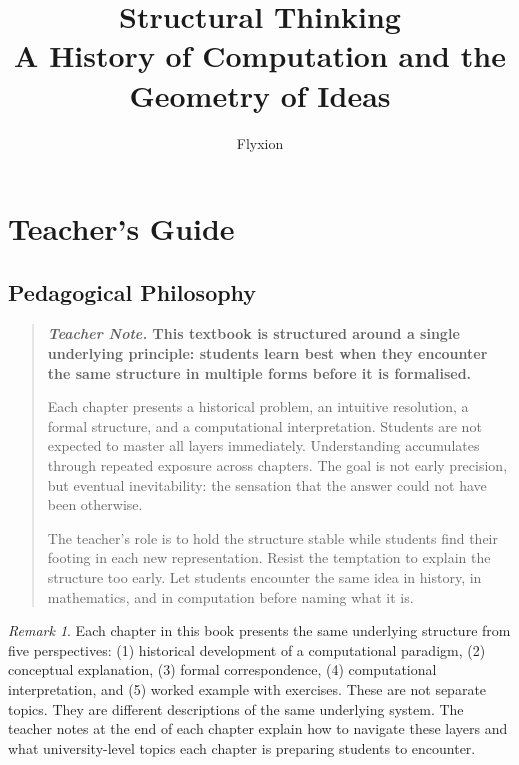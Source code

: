 \documentclass[11pt]{book}
\title{\textbf{Structural Thinking}\\[6pt]
\large A History of Computation and the Geometry of Ideas}
\author{Flyxion}
\date{}
\theoremstyle{plain}
\theoremstyle{definition}
\theoremstyle{remark}
\newtheorem{remark}[theorem]{Remark}
\newenvironment{teachernote}
  {\begin{quote}\small\bfseries\textit{Teacher Note.}\normalfont\small\enspace\ignorespaces}
  {\end{quote}}
\begin{document}

\frontmatter
\maketitle
\tableofcontents

\chapter*{Teacher's Guide}

\section*{Pedagogical Philosophy}

\begin{teachernote}
This textbook is structured around a single underlying principle:
students learn best when they encounter the same structure in multiple
forms before it is formalised.

Each chapter presents a historical problem, an intuitive resolution, a
formal structure, and a computational interpretation. Students are not
expected to master all layers immediately. Understanding accumulates
through repeated exposure across chapters. The goal is not early
precision, but eventual inevitability: the sensation that the answer
could not have been otherwise.

The teacher's role is to hold the structure stable while students find
their footing in each new representation. Resist the temptation to
explain the structure too early. Let students encounter the same idea
in history, in mathematics, and in computation before naming what it is.
\end{teachernote}

\begin{remark}
Each chapter in this book presents the same underlying structure from
five perspectives: (1) historical development of a computational
paradigm, (2) conceptual explanation, (3) formal correspondence,
(4) computational interpretation, and (5) worked example with exercises.
These are not separate topics. They are different descriptions of the
same underlying system. The teacher notes at the end of each chapter
explain how to navigate these layers and what university-level topics
each chapter is preparing students to encounter.
\end{remark}
\end{document}
